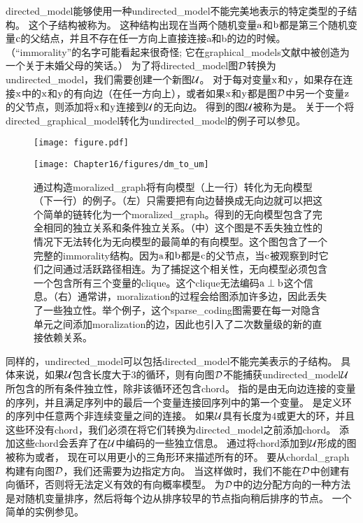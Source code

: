 \gls{directed_model}能够使用一种\gls{undirected_model}不能完美地表示的特定类型的子结构。
这个子结构被称为。
这种结构出现在当两个随机变量$\mathrm{a}$和$\mathrm{b}$都是第三个随机变量$\mathrm{c}$的父结点，并且不存在任一方向上直接连接a和b的边的时候。
（``\gls{immorality}''的名字可能看起来很奇怪; 它在\gls{graphical_models}文献中被创造为一个关于未婚父母的笑话。）
为了将\gls{directed_model}图$\mathcal{D}$转换为\gls{undirected_model}，我们需要创建一个新图$\mathcal{U}$。
对于每对变量$\mathrm{x}$和$\mathrm{y}$，如果存在连接$\mathrm{x}$中的$\mathrm{x}$和$\mathrm{y}$的有向边（在任一方向上），或者如果$\mathrm{x}$和$\mathrm{y}$都是图$\mathcal{D}$中另一个变量$\mathrm{z}$的父节点，则添加将$\mathrm{x}$和$\mathrm{y}$连接到$\mathcal{U}$的无向边。 
得到的图$\mathcal{U}$被称为是。
关于一个将\gls{directed_graphical_model}转化为\gls{undirected_model}的例子可以参见。


\begin{figure}[!htb]
\ifOpenSource
\centerline{\texttt{[image: figure.pdf]}}
\else
	\centerline{\texttt{[image: Chapter16/figures/dm\_to\_um]}}	
\fi
	\caption{通过构造\gls{moralized_graph}将有向模型（上一行）转化为无向模型（下一行）的例子。（左）只需要把有向边替换成无向边就可以把这个简单的链转化为一个\gls{moralized_graph}。得到的无向模型包含了完全相同的独立关系和条件独立关系。（中）这个图是不丢失独立性的情况下无法转化为无向模型的最简单的有向模型。这个图包含了一个完整的\gls{immorality}结构。因为$\mathrm{a}$和$\mathrm{b}$都是$\mathrm{c}$的父节点，当$\mathrm{c}$被观察到时它们之间通过活跃路径相连。为了捕捉这个相关性，无向模型必须包含一个包含所有三个变量的\gls{clique}。这个\gls{clique}无法编码$\mathrm{a} \perp \mathrm{b}$这个信息。（右）通常讲，\gls{moralization}的过程会给图添加许多边，因此丢失了一些独立性。举个例子，这个\gls{sparse_coding}图需要在每一对隐含单元之间添加\gls{moralization}的边，因此也引入了二次数量级的新的直接依赖关系。}
	\label{fig:dm_to_um}
\end{figure}



同样的，\gls{undirected_model}可以包括\gls{directed_model}不能完美表示的子结构。
具体来说，如果$\mathcal{U}$包含长度大于$3$的循环，则有向图$\mathcal{D}$不能捕获\gls{undirected_model}$\mathcal{U}$所包含的所有条件独立性，除非该循环还包含\gls{chord}。
指的是由无向边连接的变量的序列，并且满足序列中的最后一个变量连接回序列中的第一个变量。
是定义环的序列中任意两个非连续变量之间的连接。
如果$\mathcal{U}$具有长度为$4$或更大的环，并且这些环没有\gls{chord}，我们必须在将它们转换为\gls{directed_model}之前添加\gls{chord}。
添加这些\gls{chord}会丢弃了在$\mathcal{U}$中编码的一些独立信息。
通过将\gls{chord}添加到$\mathcal{U}$形成的图被称为或者，
现在可以用更小的三角形环来描述所有的环。
要从\gls{chordal_graph}构建有向图$\mathcal{D}$，我们还需要为边指定方向。
当这样做时，我们不能在$\mathcal{D}$中创建有向循环，否则将无法定义有效的有向概率模型。
为$\mathcal{D}$中的边分配方向的一种方法是对随机变量排序，然后将每个边从排序较早的节点指向稍后排序的节点。
一个简单的实例参见。


